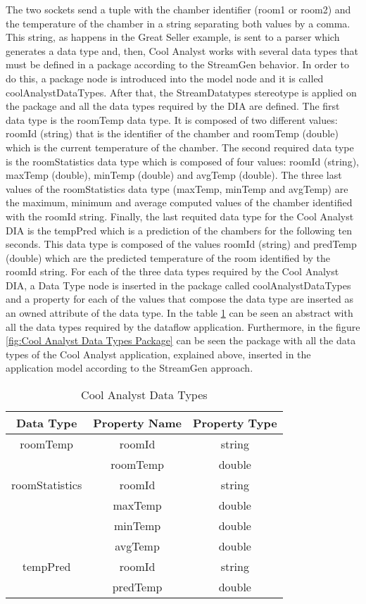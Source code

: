 The two sockets send a tuple with the chamber identifier (room1 or room2) and the temperature of the chamber in a string separating both values by a comma. This string, as happens in the Great Seller example, is sent to a parser which generates a data type and, then, Cool Analyst works with several data types that must be defined in a package according to the StreamGen behavior. In order to do this, a package node is introduced into the model node and it is called coolAnalystDataTypes. After that, the StreamDatatypes stereotype is applied on the package and all the data types required by the DIA are defined. The first data type is the roomTemp data type. It is composed of two different values: roomId (string) that is the identifier of the chamber and roomTemp (double) which is the current temperature of the chamber. The second required data type is the roomStatistics data type which is composed of four values: roomId (string), maxTemp (double), minTemp (double) and avgTemp (double). The three last values of the roomStatistics data type (maxTemp, minTemp and avgTemp) are the maximum, minimum and average computed values of the chamber identified with the roomId string. Finally, the last requited data type for the Cool Analyst DIA is the tempPred which is a prediction of the chambers for the following ten seconds. This data type is composed of the values roomId (string) and predTemp (double) which are the predicted temperature of the room identified by the roomId string. For each of the three data types required by the Cool Analyst DIA, a Data Type node is inserted in the package called coolAnalystDataTypes and a property for each of the values that compose the data type are inserted as an owned attribute of the data type. In the table \ref{Cool Analyst Data Types} can be seen an abstract with all the data types required by the dataflow application. Furthermore, in the figure \ref{fig:Cool Analyst Data Types Package} can be seen the package with all the data types of the Cool Analyst application, explained above, inserted in the application model according to the StreamGen approach.

\begin{table}[h!]
\centering
	\begin{tabular}{||c|c|c||} 
	\hline\hline
	Data Type & Property Name & Property Type \\ [1ex] 
	\hline\hline
	roomTemp & roomId & string  \\
	& roomTemp & double  \\
	\hline
	roomStatistics & roomId & string  \\
	& maxTemp & double \\
	& minTemp & double  \\
	& avgTemp & double \\
	\hline
	tempPred & roomId & string  \\
	& predTemp & double \\
	\hline\hline
	\end{tabular}
\caption{Cool Analyst Data Types}
\label{Cool Analyst Data Types}
\end{table}

